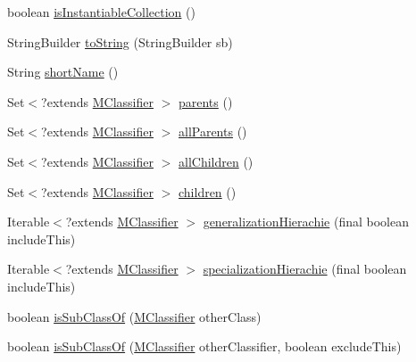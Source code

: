 \begin{DoxyCompactItemize}
\item 
boolean \hyperlink{classorg_1_1tzi_1_1use_1_1uml_1_1mm_1_1_m_classifier_impl_aebac17ad072b38a7e183066f22650cb3}{is\-Instantiable\-Collection} ()
\item 
String\-Builder \hyperlink{classorg_1_1tzi_1_1use_1_1uml_1_1mm_1_1_m_classifier_impl_a845201ecc7c77b3e38f25f94d1414892}{to\-String} (String\-Builder sb)
\item 
String \hyperlink{classorg_1_1tzi_1_1use_1_1uml_1_1mm_1_1_m_classifier_impl_ae44570453e632beae7012efa74de0f1c}{short\-Name} ()
\item 
Set$<$?extends \hyperlink{interfaceorg_1_1tzi_1_1use_1_1uml_1_1mm_1_1_m_classifier}{M\-Classifier} $>$ \hyperlink{classorg_1_1tzi_1_1use_1_1uml_1_1mm_1_1_m_classifier_impl_a3ce1653cd26fe298d9c99a1d78a203a6}{parents} ()
\item 
Set$<$?extends \hyperlink{interfaceorg_1_1tzi_1_1use_1_1uml_1_1mm_1_1_m_classifier}{M\-Classifier} $>$ \hyperlink{classorg_1_1tzi_1_1use_1_1uml_1_1mm_1_1_m_classifier_impl_a2e70487208d48a3e344b621a8e153600}{all\-Parents} ()
\item 
Set$<$?extends \hyperlink{interfaceorg_1_1tzi_1_1use_1_1uml_1_1mm_1_1_m_classifier}{M\-Classifier} $>$ \hyperlink{classorg_1_1tzi_1_1use_1_1uml_1_1mm_1_1_m_classifier_impl_ac91f7e84ae2a92af19c1da5c832589db}{all\-Children} ()
\item 
Set$<$?extends \hyperlink{interfaceorg_1_1tzi_1_1use_1_1uml_1_1mm_1_1_m_classifier}{M\-Classifier} $>$ \hyperlink{classorg_1_1tzi_1_1use_1_1uml_1_1mm_1_1_m_classifier_impl_a7c7312bcc7e8b8ad3d3d624b0dc365f8}{children} ()
\item 
Iterable$<$?extends \hyperlink{interfaceorg_1_1tzi_1_1use_1_1uml_1_1mm_1_1_m_classifier}{M\-Classifier} $>$ \hyperlink{classorg_1_1tzi_1_1use_1_1uml_1_1mm_1_1_m_classifier_impl_ac560f2e2c5075c4e509346894bf136a2}{generalization\-Hierachie} (final boolean include\-This)
\item 
Iterable$<$?extends \hyperlink{interfaceorg_1_1tzi_1_1use_1_1uml_1_1mm_1_1_m_classifier}{M\-Classifier} $>$ \hyperlink{classorg_1_1tzi_1_1use_1_1uml_1_1mm_1_1_m_classifier_impl_a71ccceafbd4ca264c85f640292f1eaa0}{specialization\-Hierachie} (final boolean include\-This)
\item 
boolean \hyperlink{classorg_1_1tzi_1_1use_1_1uml_1_1mm_1_1_m_classifier_impl_afdc28b5405275aec5959f2177b53297a}{is\-Sub\-Class\-Of} (\hyperlink{interfaceorg_1_1tzi_1_1use_1_1uml_1_1mm_1_1_m_classifier}{M\-Classifier} other\-Class)
\item 
boolean \hyperlink{classorg_1_1tzi_1_1use_1_1uml_1_1mm_1_1_m_classifier_impl_ada2f0b3548405c0cf104c0838153cb6e}{is\-Sub\-Class\-Of} (\hyperlink{interfaceorg_1_1tzi_1_1use_1_1uml_1_1mm_1_1_m_classifier}{M\-Classifier} other\-Classifier, boolean exclude\-This)

\end{DoxyCompactItemize}
